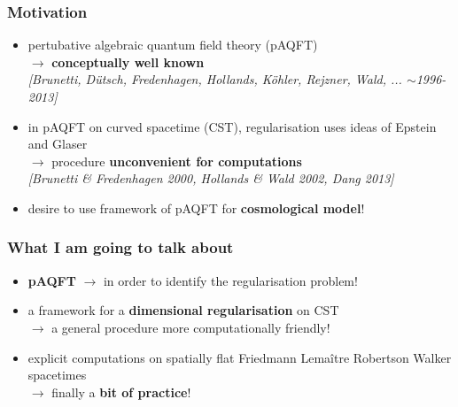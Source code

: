 \documentclass[9pt]{beamer}
\newcommand{\citebeam}[1]{\textit{\textcolor{black!60!white}{[#1]}}} %
\begin{document}
\begin{frame}

  \frametitle{Motivation}
  
  \begin{itemize}
    
    \item pertubative algebraic quantum field theory (pAQFT) \\
    $\to$ \textbf{conceptually well known} \\
    \citebeam{Brunetti, Dütsch, Fredenhagen, Hollands, K\"ohler, Rejzner, Wald, ... $\sim$1996-2013} \\
    
    \item in pAQFT on curved spacetime (CST), regularisation uses ideas of Epstein and Glaser \\
    $\to$ procedure \textbf{unconvenient for computations} \\
    \citebeam{Brunetti \& Fredenhagen 2000, Hollands \& Wald 2002, Dang 2013} \\
    
    \item desire to use framework of pAQFT for \textbf{cosmological model}! \\
  
  \end{itemize}

\end{frame}


\begin{frame}

  \frametitle{What I am going to talk about}
  
  \begin{itemize}
   
    \item \textbf{pAQFT} $\to$ in order to identify the regularisation problem! \\
   
    \item a framework for a \textbf{dimensional regularisation} on CST \\
    $\to$ a general procedure more computationally friendly! \\
   
    \item explicit computations on spatially flat Friedmann Lemaître Robertson Walker spacetimes \\
    $\to$ finally a \textbf{bit of practice}!
   
  \end{itemize}

\end{frame}
\end{document}
